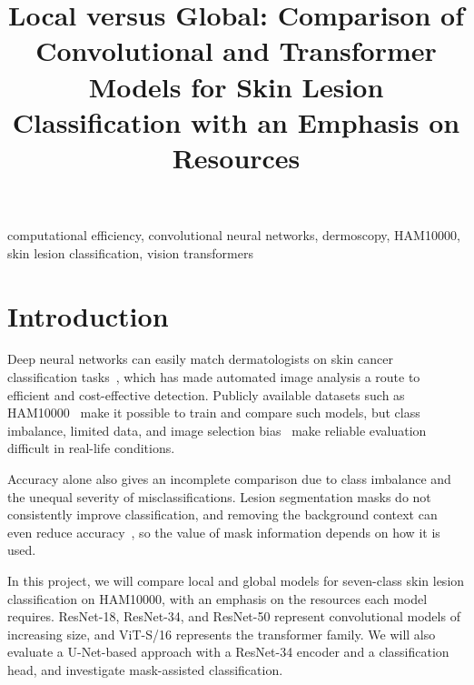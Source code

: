\documentclass[conference]{IEEEtran}
\begin{document}
\title{Local versus Global: Comparison of Convolutional and Transformer Models for Skin Lesion Classification with an Emphasis on Resources}

\author{

}
\maketitle

\begin{abstract}

\end{abstract}

\begin{IEEEkeywords}
computational efficiency, convolutional neural networks, dermoscopy, HAM10000, skin lesion classification, vision transformers
\end{IEEEkeywords}

\section{Introduction}\label{sec:introduction}
Deep neural networks can easily match dermatologists on skin cancer classification tasks~\cite{b1}, which has made automated image analysis a route to efficient and cost-effective detection.
Publicly available datasets such as HAM10000~\cite{b2} make it possible to train and compare such models, but class imbalance, limited data, and image selection bias~\cite{b3} make reliable evaluation difficult in real-life conditions.

Accuracy alone also gives an incomplete comparison due to class imbalance and the unequal severity of misclassifications.
Lesion segmentation masks do not consistently improve classification, and removing the background context can even reduce accuracy~\cite{b6}, so the value of mask information depends on how it is used.

In this project, we will compare local and global models for seven-class skin lesion classification on HAM10000, with an emphasis on the resources each model requires.
ResNet-18, ResNet-34, and ResNet-50 represent convolutional models of increasing size, and ViT-S/16 represents the transformer family.
We will also evaluate a U-Net-based approach with a ResNet-34 encoder and a classification head, and investigate mask-assisted classification.
\end{document}

